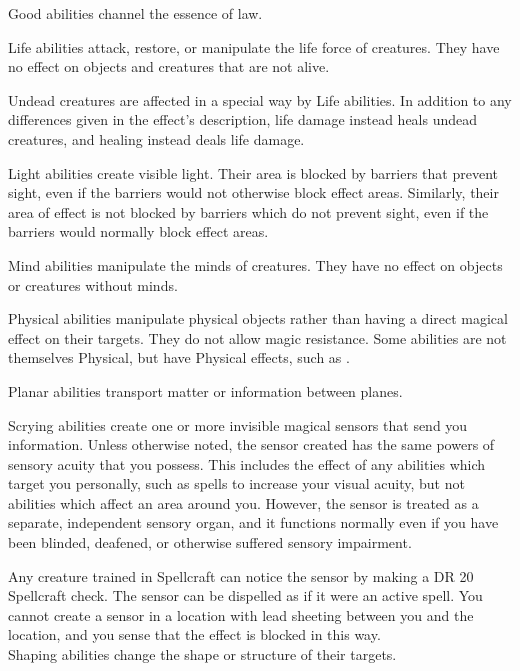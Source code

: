      Good abilities channel the essence of law.

     Life abilities attack, restore, or manipulate the life force of creatures. They have no effect on objects and creatures that are not alive.
    \par Undead creatures are affected in a special way by Life abilities. In addition to any differences given in the effect's description, life damage instead heals undead creatures, and healing instead deals life damage.

     Light abilities create visible light. Their area is blocked by barriers that prevent sight, even if the barriers would not otherwise block effect areas. Similarly, their area of effect is not blocked by barriers which do not prevent sight, even if the barriers would normally block effect areas.

     Mind abilities manipulate the minds of creatures. They have no effect on objects or creatures without minds.

     Physical abilities manipulate physical objects rather than having a direct magical effect on their targets. They do not allow magic resistance.
    Some abilities are not themselves Physical, but have Physical effects, such as .

     Planar abilities transport matter or information between planes.

     Scrying abilities create one or more invisible magical sensors that send you information.
    Unless otherwise noted, the sensor created has the same powers of sensory acuity that you possess.
    This includes the effect of any abilities which target you personally, such as spells to increase your visual acuity, but not abilities which affect an area around you.
    However, the sensor is treated as a separate, independent sensory organ, and it functions normally even if you have been blinded, deafened, or otherwise suffered sensory impairment.
    \par Any creature trained in Spellcraft can notice the sensor by making a DR 20 Spellcraft check. The sensor can be dispelled as if it were an active spell. You cannot create a sensor in a location with lead sheeting between you and the location, and you sense that the effect is blocked in this way. \\

     Shaping abilities change the shape or structure of their targets.

